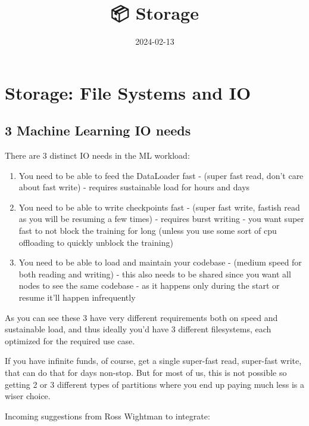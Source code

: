 \documentclass[
]{report}
\title{📦 Storage}
\author{}
\date{2024-02-13}
\providecommand{\tightlist}{%
  \setlength{\itemsep}{0pt}\setlength{\parskip}{0pt}}\usepackage{longtable,booktabs,array}
\begin{document}
\maketitle

\chapter{Storage: File Systems and
IO}\label{storage-file-systems-and-io}

\section{3 Machine Learning IO needs}\label{machine-learning-io-needs}

There are 3 distinct IO needs in the ML workload:

\begin{enumerate}
\def\labelenumi{\arabic{enumi}.}
\tightlist
\item
  You need to be able to feed the DataLoader fast - (super fast read,
  don't care about fast write) - requires sustainable load for hours and
  days
\item
  You need to be able to write checkpoints fast - (super fast write,
  fastish read as you will be resuming a few times) - requires burst
  writing - you want super fast to not block the training for long
  (unless you use some sort of cpu offloading to quickly unblock the
  training)
\item
  You need to be able to load and maintain your codebase - (medium speed
  for both reading and writing) - this also needs to be shared since you
  want all nodes to see the same codebase - as it happens only during
  the start or resume it'll happen infrequently
\end{enumerate}

As you can see these 3 have very different requirements both on speed
and sustainable load, and thus ideally you'd have 3 different
filesystems, each optimized for the required use case.

If you have infinite funds, of course, get a single super-fast read,
super-fast write, that can do that for days non-stop. But for most of
us, this is not possible so getting 2 or 3 different types of partitions
where you end up paying much less is a wiser choice.

Incoming suggestions from Ross Wightman to integrate:
\end{document}
